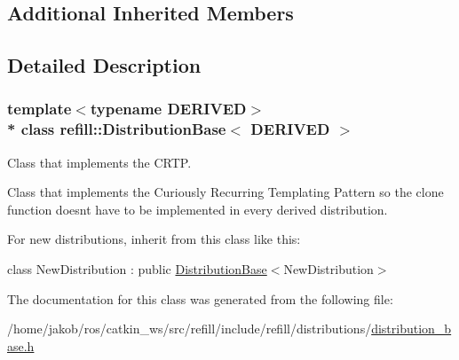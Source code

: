 \subsection*{Additional Inherited Members}


\subsection{Detailed Description}
\subsubsection*{template$<$typename D\+E\+R\+I\+V\+ED$>$\\*
class refill\+::\+Distribution\+Base$<$ D\+E\+R\+I\+V\+E\+D $>$}

Class that implements the C\+R\+TP. 

Class that implements the Curiously Recurring Templating Pattern so the clone function doesn\textquotesingle{}t have to be implemented in every derived distribution.

For new distributions, inherit from this class like this\+:

{\ttfamily class New\+Distribution \+: public \hyperlink{classrefill_1_1DistributionBase}{Distribution\+Base}$<$New\+Distribution$>$} 

The documentation for this class was generated from the following file\+:\begin{DoxyCompactItemize}
\item 
/home/jakob/ros/catkin\+\_\+ws/src/refill/include/refill/distributions/\hyperlink{distribution__base_8h}{distribution\+\_\+base.\+h}\end{DoxyCompactItemize}
